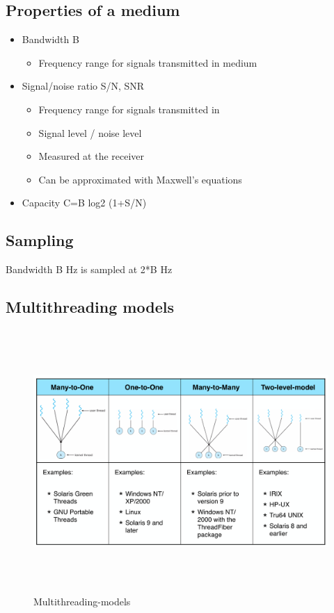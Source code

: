 \subsection{Properties of a medium}
\begin{itemize}
\item Bandwidth B
  \begin{itemize}
    \item Frequency range for signals transmitted in medium
  \end{itemize}
\item Signal/noise ratio S/N, SNR
  \begin{itemize}
    \item Frequency range for signals transmitted in
    \item Signal level / noise level
    \item Measured at the receiver
    \item Can be approximated with Maxwell’s equations
  \end{itemize}
\item Capacity C=B log2 (1+S/N)
\end{itemize}

\subsection{Sampling}
Bandwidth B Hz is sampled at 2*B Hz

\subsection{Multithreading models}
\begin{figure}[h]
    \vspace{10mm}
    \centering
    \includegraphics[width=16cm, height=10cm]{image/Multithreading-models.png}
    \caption{Multithreading-models}
\end{figure}

